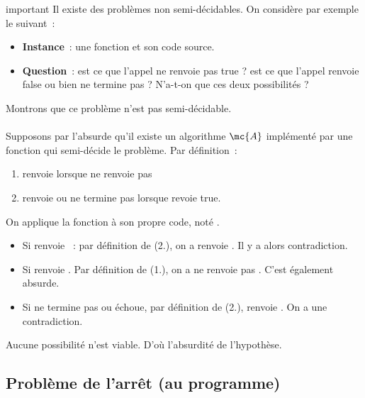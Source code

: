 \begin{adjustwidth}{-3cm}{-3cm}
\begin{exemple}{}{important}
    Il existe des problèmes non semi-décidables. On considère par exemple le suivant~:
    \begin{itemize}
        \item \textbf{Instance}~: une fonction  et  son code source.
        \item \textbf{Question}~: est ce que l'appel  ne renvoie pas true ? \ie est ce que l'appel renvoie false ou bien ne termine pas ? N'a-t-on que ces deux possibilités ?
    \end{itemize}
    Montrons que ce problème n'est pas semi-décidable.\\\\
    Supposons par l'absurde qu'il existe un algorithme $\mc{A}$ implémenté par une fonction  qui semi-décide le problème. Par définition~:
    \begin{enumerate}
        \item {} renvoie  lorsque  ne renvoie pas 
        \item {} renvoie  ou ne termine pas lorsque  revoie true.
    \end{enumerate}
    On applique la fonction  à son propre code, noté .
    \begin{itemize}
        \item Si  renvoie ~: par définition de  (2.), on a  renvoie . Il y a alors contradiction.
        \item Si  renvoie . Par définition de  (1.), on a  ne renvoie pas . C'est également absurde.
        \item Si  ne termine pas ou échoue, par définition de  (2.),  renvoie . On a une contradiction.
    \end{itemize}
    Aucune possibilité n'est viable. D'où l'absurdité de l'hypothèse.
\end{exemple}

\subsection{Problème de l'arrêt (au programme)}


\end{adjustwidth}
